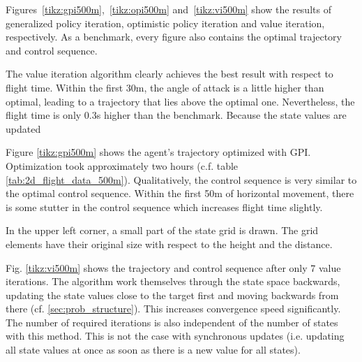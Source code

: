 Figures~\ref{tikz:gpi500m},~\ref{tikz:opi500m} and~\ref{tikz:vi500m} show the results of generalized policy iteration, optimistic policy iteration and value iteration, respectively. As a benchmark, every figure also contains the optimal trajectory and control sequence.

The value iteration algorithm clearly achieves the best result with respect to flight time. Within the first 30m, the angle of attack is a little higher than optimal, leading to a trajectory that lies above the optimal one. Nevertheless, the flight time is only 0.3s higher than the benchmark. Because the state values are updated 

Figure \ref{tikz:gpi500m} shows the agent's trajectory optimized with GPI. Optimization took approximately two hours (c.f. table \ref{tab:2d_flight_data_500m}). Qualitatively, the control sequence is very similar to the optimal control sequence. Within the first 50m of horizontal movement, there is some stutter in the control sequence which increases flight time slightly. 

In the upper left corner, a small part of the state grid is drawn. The grid elements have their original size with respect to the height and the distance.

Fig. \ref{tikz:vi500m} shows the trajectory and control sequence after only 7 value iterations.
The algorithm work themselves through the state space backwards, updating the state values close to the target first and moving backwards from there (cf. \ref{sec:prob_structure}). This increases convergence speed significantly. The number of required iterations is also independent of the number of states with this method. This is not the case with synchronous updates (i.e. updating all state values at once as soon as there is a new value for all states). 

